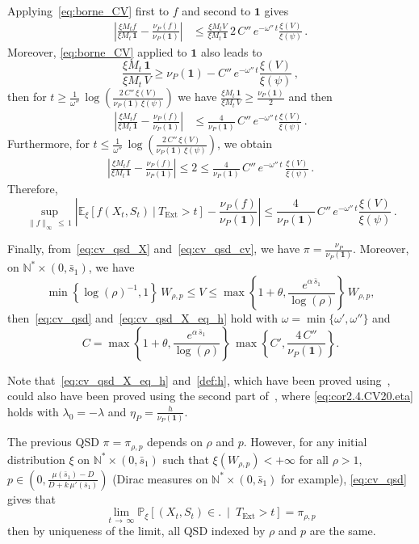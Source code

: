 \documentclass[AHL,Unicode,longabstracts,published]{cedram}
\newcommand{\PP}{\mathbb{P}}
\newcommand{\NN}{\mathbb{N}}
\newcommand{\EE}{\mathbb{E}}
\newcommand{\X}{\NN^* \times (0,\bar s_1)}
\newcommand{\Text}{T_{\mathrm{Ext}}}
\newcommand{\1}{\mathbf{1}}
\begin{document}
Applying~\eqref{eq:borne_CV} first to $f$ and second to $\1$ gives
\begin{align*}
\left| \frac{\xi M_t f}{\xi M_t\,\1} - \frac{\nu_P(f)}{\nu_P(\1)}\right| &\leq
\frac{\xi M_t V}{\xi M_t\,\1}\, 2\,C''\,e^{-\omega''\,t} \frac{\xi(V)}{\xi(\psi)}\,.
\end{align*}
Moreover, \eqref{eq:borne_CV} applied to $\1$ also leads to
\[
\frac{\xi M_t\,\1}{\xi M_t\,V} \geq \nu_P(\1) - C''\,e^{-\omega''\,t} \frac{\xi(V)}{\xi(\psi)}\,,
\]
then for $t\geq \frac{1}{\omega''}\,\log(\frac{2\,C''\,\xi(V)}{\nu_P(\1)\,\xi(\psi)})$ we have $\frac{\xi M_t\,\1}{\xi M_t\,V} \geq \frac{\nu_P(\1)}{2}$ and then
\begin{align*}
\left| \frac{\xi M_t f}{\xi M_t\,\1} - \frac{\nu_P(f)}{\nu_P(\1)}\right| &\leq
\frac{4}{\nu_P(\1)}\, C''\,e^{-\omega''\,t} \frac{\xi(V)}{\xi(\psi)}\,.
\end{align*}
Furthermore, for $t\leq \frac{1}{\omega''}\,\log(\frac{2\,C''\,\xi(V)}{\nu_P(\1)\,\xi(\psi)})$, we obtain
\begin{align*}
\left| \frac{\xi M_t f}{\xi M_t\,\1} - \frac{\nu_P(f)}{\nu_P(\1)}\right| \leq 2\leq \frac{4}{\nu_P(\1)}\,C''\,e^{-\omega''\,t}\,\frac{\xi(V)}{\xi(\psi)}\,.
\end{align*}
Therefore,
\begin{equation}\label{eq:cv_qsd_cv}
\sup_{\|f \|_\infty\,\leq\,1} \left|\EE_\xi \left[f(X_t,S_t) \ | \ \Text>t\right] - \frac{\nu_P(f)}{\nu_P(\1)} \right| \leq \frac{4}{\nu_P(\1)}\, C''\,e^{-\omega''\,t} \frac{\xi(V)}{\xi(\psi)}\,.
\end{equation}



Finally, from~\eqref{eq:cv_qsd_X} and~\eqref{eq:cv_qsd_cv}, we have $\pi = \frac{\nu_P}{\nu_P(\1)}$. Moreover, on $\X$, we have
\[
\min\left\{\log(\rho)^{-1},1\right\}\,W_{\rho,p} \leq V\leq \max\left\{1+\theta,\frac{e^{\alpha\,\bar s_1}}{\log{(\rho)}}\right\}\, W_{\rho,p},
\]
then~\eqref{eq:cv_qsd} and~\eqref{eq:cv_qsd_X_eq_h} hold with $\omega=\min\{\omega',\omega''\}$ and 
\[
C=\max\left\{1+\theta,\frac{e^{\alpha\,\bar s_1}}{\log(\rho)}\right\}\,\max\left\{C',\frac{4\,C''}{\nu_P(\1)}\right\}.
\]

Note that~\eqref{eq:cv_qsd_X_eq_h} and~\eqref{def:h}, which have been proved using~\cite[Theorem~5.1]{BCGM}, could also have been proved using the second part of~\cite[Corollary~2.4]{CV20}, where \eqref{eq:cor2.4.CV20.eta} holds with $\lambda_0=-\lambda$ and $\eta_P= \frac{h}{\nu_P(\1)}$.


The previous QSD $\pi=\pi_{\rho,p}$ depends on $\rho$ and $p$. However, for any initial distribution $\xi$ on $\NN^*\times (0, \bar s_1)$ such that $\xi(W_{\rho,p})<+\infty$ for all $\rho>1$, $p\in(0,\frac{\mu(\bar s_1)-D}{D+k\,\mu'(\bar s_1)})$ (Dirac measures on $\NN^*\times (0, \bar s_1)$ for example), \eqref{eq:cv_qsd} gives that
\[
\lim_{t\,\to\,\infty}\PP_\xi \left[(X_t,S_t)\in. \ \middle| \ \Text>t\right] = \pi_{\rho,p}
\]
then by uniqueness of the limit, all QSD indexed by $\rho$ and $p$ are the same.
\end{document}
